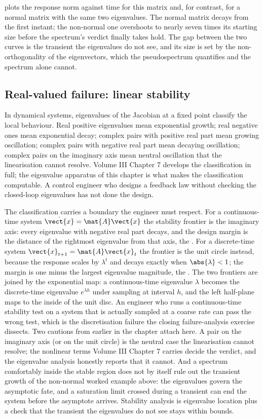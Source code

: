  plots the response norm
against time for this matrix and, for contrast, for a normal matrix
with the same two eigenvalues. The normal matrix decays from the first
instant; the non-normal one overshoots to nearly seven times its
starting size before the spectrum's verdict finally takes hold. The
gap between the two curves is the transient the eigenvalues do not
see, and its size is set by the non-orthogonality of the
eigenvectors, which the pseudospectrum quantifies and the spectrum
alone cannot.

\subsection{Real-valued failure: linear stability}

In dynamical systems, eigenvalues of the Jacobian at a fixed point
classify the local behaviour. Real positive eigenvalues mean
exponential growth; real negative ones mean exponential decay;
complex pairs with positive real part mean growing oscillation;
complex pairs with negative real part mean decaying oscillation;
complex pairs on the imaginary axis mean neutral oscillation that
the linearisation cannot resolve. Volume III Chapter 7 develops the
classification in full; the eigenvalue apparatus of this chapter is
what makes the classification computable. A control engineer who
designs a feedback law without checking the closed-loop eigenvalues
has not done the design.

The classification carries a boundary the engineer must respect. For a
continuous-time system $\dot{\vect{x}} = \mat{A}\vect{x}$ the stability
frontier is the imaginary axis: every eigenvalue with negative real
part decays, and the design margin is the distance of the rightmost
eigenvalue from that axis, the . For a
discrete-time system $\vect{x}_{t+1} = \mat{A}\vect{x}_t$ the frontier
is the unit circle instead, because the response scales by
$\lambda^{t}$ and decays exactly when $\abs{\lambda} < 1$; the margin
is one minus the largest eigenvalue magnitude, the . The two frontiers are joined by the exponential map: a
continuous-time eigenvalue $\lambda$ becomes the discrete-time
eigenvalue $e^{\lambda h}$ under sampling at interval $h$, and the left
half-plane maps to the inside of the unit disc. An engineer who runs a
continuous-time stability test on a system that is actually sampled at
a coarse rate can pass the wrong test, which is the discretisation
failure the closing failure-analysis exercise dissects. Two cautions
from earlier in the chapter attach here. A pair on the imaginary axis
(or on the unit circle) is the neutral case the linearisation cannot
resolve; the nonlinear terms Volume III Chapter 7 carries decide the
verdict, and the eigenvalue analysis honestly reports that it cannot.
And a spectrum comfortably inside the stable region does not by itself
rule out the transient growth of the non-normal worked example above:
the eigenvalues govern the asymptotic fate, and a saturation limit
crossed during a transient can end the system before the asymptote
arrives. Stability analysis is eigenvalue location plus a check that
the transient the eigenvalues do not see stays within bounds.

